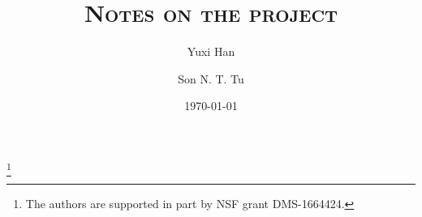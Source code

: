 \documentclass[11pt,reqno]{amsart}
\numberwithin{figure}{section}
\theoremstyle{plain}
\theoremstyle{remark}
\numberwithin{equation}{section}
\begin{document}
\title[Rate of convergence]
{\textsc{Notes on the project}}
\thanks{The authors are supported in part by NSF grant DMS-1664424.}
\author{Yuxi Han}
\address[Y. Han]
{
Department of Mathematics, 
University of Wisconsin Madison, 480 Lincoln  Drive, Madison, WI 53706, USA}
\author{Son N. T. Tu}
\address[S. N.T. Tu]
{
Department of Mathematics, 
University of Wisconsin Madison, 480 Lincoln  Drive, Madison, WI 53706, USA}
\date{\today}
\maketitle
\setcounter{tocdepth}{1}

\end{document}
